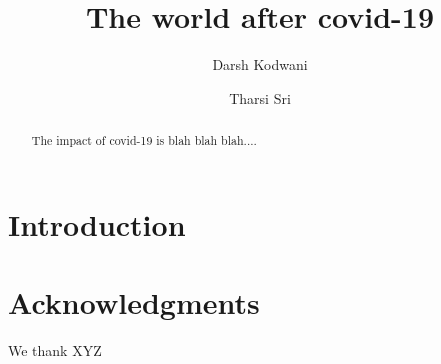 \documentclass[aps,prd,onecolumn,amssymb,amsmath,floatfix,nofootinbib,superscriptaddress]{revtex4-1}
\begin{document}
\title{The world after covid-19}

\author{Darsh Kodwani}

\author{Tharsi Sri}
\affiliation{}

\begin{abstract}
The impact of covid-19 is blah blah blah....
\end{abstract}

\maketitle


\section{Introduction}

\section*{Acknowledgments}
\noindent

We thank XYZ


\end{document}

